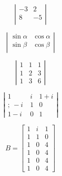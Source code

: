 \documentclass[12pt]{article}
\begin{document}
$$
\left| \begin{array}{ccc}
-3 & 2 \\
8 & -5 \\
\end{array} \right|
$$

$$
\left| \begin{array}{ccc}
\sin\alpha & \cos\alpha \\
\sin\beta & \cos\beta \\
\end{array} \right|
$$

$$
\left| \begin{array}{ccc}
1 & 1 & 1 \\
1 & 2 & 3 \\
1 & 3 & 6
\end{array} \right|
$$

$$
\left| \begin{array}{ccc}
1 & i & 1+i \\
;\ -i\ & 1 & 0 \\
1-i & 0 & 1
\end{array} \right|
$$

$$
B =\left[ \begin{array}{ccc}
1 & i & 1  \\
1 & 1 & 0  \\
1 & 0 & 4  \\
1 & 0 & 4  \\
1 & 0 & 4  \\
1 & 0 & 4   
\end{array} \right]
$$
\end{document}
